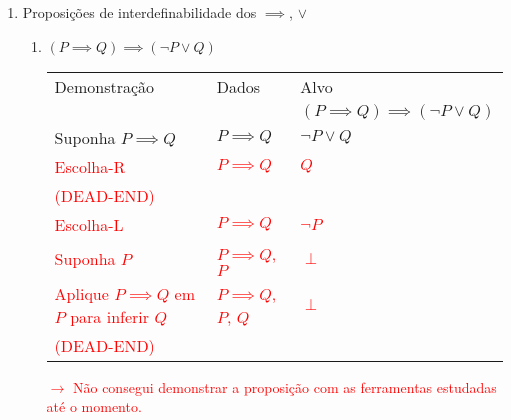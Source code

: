 \documentclass[a4paper, 12pt]{article}
\begin{document}
\begin{enumerate}
    \item Proposições de interdefinabilidade dos $\implies$, $\lor$
    \begin{enumerate}[1.]
        \item $(P \implies Q) \implies (\neg P \lor Q)$
        \begin{table}[h!]
            \centering
            \begin{tabular}{|p{4cm} | p{4cm} | p{4cm} |}
            \rowcolor{gray!50}
            Demonstração & Dados & Alvo \\
            & & $(P \implies Q) \implies (\neg P \lor Q)$ \\
            Suponha $P \implies Q$ & $P \implies Q$ & $\neg P \lor Q$ \\
            \hline
            \textcolor{red}{Escolha-R}  & \textcolor{red}{$P \implies Q$} & \textcolor{red}{$Q$} \\
            \textcolor{red}{(DEAD-END)} & & \\
            \hline
            \textcolor{red}{Escolha-L}  & \textcolor{red}{$P \implies Q$} & \textcolor{red}{$\neg P$} \\
            \textcolor{red}{Suponha $P$} & \textcolor{red}{$P \implies Q$, $P$} & \textcolor{red}{$\perp$} \\
            \textcolor{red}{Aplique $P \implies Q$ em $P$ para inferir $Q$} & \textcolor{red}{$P \implies Q$, $P$, $Q$} & \textcolor{red}{$\perp$} \\
            \textcolor{red}{(DEAD-END)} & & \\
            \hline
            \end{tabular}
        \end{table}

        \textcolor{red}{$\rightarrow$ Não consegui demonstrar a proposição com as ferramentas estudadas até o momento.}


\end{enumerate}
\end{enumerate}
\end{document}
